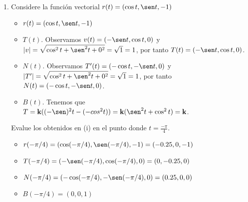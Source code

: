 \documentclass[10pt,letterpaper,fleqn]{article}
\begin{document}
\begin{enumerate}
        \item Considere la función vectorial $r(t) = (\cos t, \sen t, -1)$
        \begin{itemize}

        	\item $r(t) = (\cos t, \sen t, -1)$
        	\item $T(t)$. Observamos $v(t) = (-\sen t,\cos t, 0)$ y $|v|= \sqrt{\cos^2 t + \sen^2 t + 0^2}=\sqrt{1} = 1$,
        		  por tanto $T(t) = (-\sen t,\cos t, 0)$.
        	\item $N(t)$. Observamos $T'(t) = (-\cos t, -\sen t, 0)$ y $|T'| = \sqrt{\cos^2 t + \sen^2 t + 0^2}=\sqrt{1} = 1$,
        		  por tanto $N(t) = (-\cos t, -\sen t, 0)$.
        	\item $B(t)$. Tenemos que $T = \textbf{k}((-\sen)^2 t - (-cos^2 t)) = \textbf{k}(\sen^2 t + \cos^2 t) = \textbf{k}$.

        \end{itemize}

        Evalue los obtenidos en (i) en el punto donde $t=\frac{-\pi}{4}$.
		\begin{itemize}
		
			\item $r(-\pi /4) = (\cos(-\pi /4), \sen(-\pi /4) , -1) = (-0.25, 0 , -1)$
			\item $T(-\pi /4) = (-\sen (-\pi /4),\cos (-\pi /4), 0) = (0, -0.25, 0)$
			\item $N(-\pi /4) = (-\cos (-\pi /4), -\sen (-\pi /4), 0) = (0.25, 0 , 0)$
			\item $B(-\pi /4) = (0,0,1)$
		\end{itemize}        


    \end{enumerate}
\end{document}
